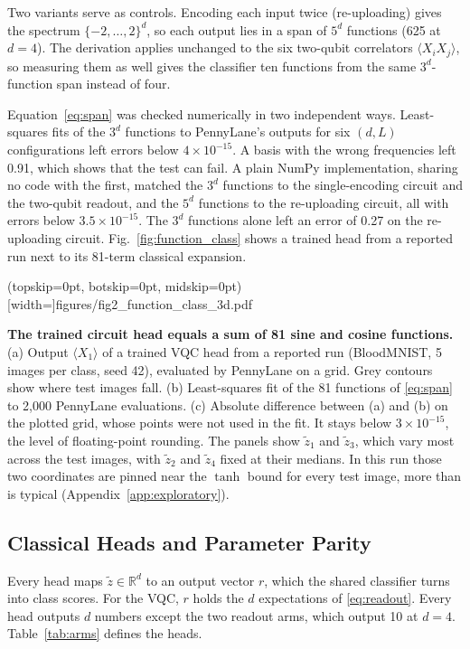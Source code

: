 \documentclass{ieeeaccess}
\newcommand{\vqc}{VQC}
\newcommand{\widecap}[1]{\parbox[t]{0.87\textwidth}{#1}}
\begin{document}
Two variants serve as controls. Encoding each input twice (re-uploading) gives the spectrum $\{-2,\dots,2\}^d$, so each output lies in a span of $5^d$ functions (625 at $d=4$). The derivation applies unchanged to the six two-qubit correlators $\langle X_iX_j\rangle$, so measuring them as well gives the classifier ten functions from the same $3^d$-function span instead of four.

Equation~\eqref{eq:span} was checked numerically in two independent ways. Least-squares fits of the $3^d$ functions to PennyLane's outputs for six $(d,L)$ configurations left errors below $4\times10^{-15}$. A basis with the wrong frequencies left 0.91, which shows that the test can fail. A plain NumPy implementation, sharing no code with the first, matched the $3^d$ functions to the single-encoding circuit and the two-qubit readout, and the $5^d$ functions to the re-uploading circuit, all with errors below $3.5\times10^{-15}$. The $3^d$ functions alone left an error of 0.27 on the re-uploading circuit. Fig.~\ref{fig:function_class} shows a trained head from a reported run next to its 81-term classical expansion.

\Figure[t!](topskip=0pt, botskip=0pt, midskip=0pt)[width=\textwidth]{figures/fig2_function_class_3d.pdf}
{\widecap{\textbf{The trained circuit head equals a sum of 81 sine and cosine functions.} (a) Output $\langle X_1\rangle$ of a trained \vqc{} head from a reported run (BloodMNIST, 5 images per class, seed 42), evaluated by PennyLane on a grid. Grey contours show where test images fall. (b) Least-squares fit of the 81 functions of \eqref{eq:span} to 2,000 PennyLane evaluations. (c) Absolute difference between (a) and (b) on the plotted grid, whose points were not used in the fit. It stays below $3\times10^{-15}$, the level of floating-point rounding. The panels show $\tilde z_1$ and $\tilde z_3$, which vary most across the test images, with $\tilde z_2$ and $\tilde z_4$ fixed at their medians. In this run those two coordinates are pinned near the $\tanh$ bound for every test image, more than is typical (Appendix~\ref{app:exploratory}).}\label{fig:function_class}}

\subsection{Classical Heads and Parameter Parity}
Every head maps $\tilde z\in\mathbb{R}^d$ to an output vector $r$, which the shared classifier turns into class scores. For the \vqc{}, $r$ holds the $d$ expectations of \eqref{eq:readout}. Every head outputs $d$ numbers except the two readout arms, which output 10 at $d=4$. Table~\ref{tab:arms} defines the heads.
\end{document}
